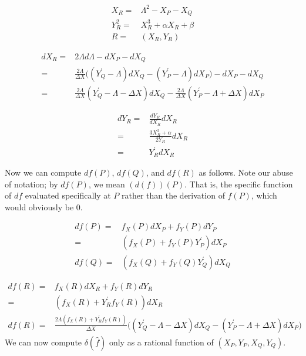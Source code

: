 \documentclass[11pt,letterpaper]{article}
\theoremstyle{definition}
\newcommand{\6}{\mathbf}
\newcommand{\7}{\mathcal}
\begin{document}
\begin{align}
X_R =& \Lambda^2 - X_P - X_Q \label{xr}\\
Y_R^2 =& X_R^3 + \alpha X_R + \beta \label{yr2}\\
R =& (X_R, Y_R) \label{r}
\end{align}

\begin{align}
dX_R =& 2\Lambda d\Lambda - dX_P - dX_Q \\
=& \frac{2\Lambda}{\Delta X} \Big( \left(Y_Q^\prime - \Lambda\right)dX_Q - \left(Y_P^\prime - \Lambda\right)dX_P\Big) - dX_P - dX_Q\\
=& \frac{2\Lambda}{\Delta X}\left(Y_Q^\prime-\Lambda - \Delta X\right)dX_Q - \frac{2\Lambda}{\Delta X}\left(Y_P^\prime-\Lambda + \Delta X\right)dX_P \label{dxr}
\end{align}


\begin{align}
dY_R =& \frac{dY_R}{dX_R}dX_R \\
=& \frac{3X_R^2+\alpha}{2Y_R} dX_R \\
=& Y_R^\prime dX_R \label{dyr}
\end{align}

Now we can compute $df(P)$, $df(Q)$, and $df(R)$ as follows. Note our abuse of notation; by $df(P)$, we mean $(d(f))(P)$. That is, the specific function of $df$ evaluated specifically at $P$ rather than the derivation of $f(P)$, which would obviously be 0.

\begin{align}
df(P) =& f_X(P) dX_P + f_Y(P) dY_P\\
=& (f_X(P) + f_Y(P)Y_P^\prime)dX_P \label{dfp}\\
df(Q) =& (f_X(Q) + f_Y(Q)Y_Q^\prime)dX_Q \label{dfq}
\end{align}

\begin{align}
df(R) =& f_X(R)dX_R + f_Y(R) dY_R \\
=& (f_X(R) + Y^\prime_R f_Y(R))dX_R \\
df(R) =& \frac{2\Lambda(f_X(R) + Y^\prime_R f_Y(R))}{\Delta X}\Big(\left(Y_Q^\prime - \Lambda - \Delta X\right) dX_Q  - \left(Y_P^\prime - \Lambda + \Delta X\right)dX_P\Big) \label{dfr}
\end{align}
We can now compute $\delta(\widehat{f})$ only as a rational function of $(X_P, Y_P, X_Q, Y_Q)$. 
\end{document}
